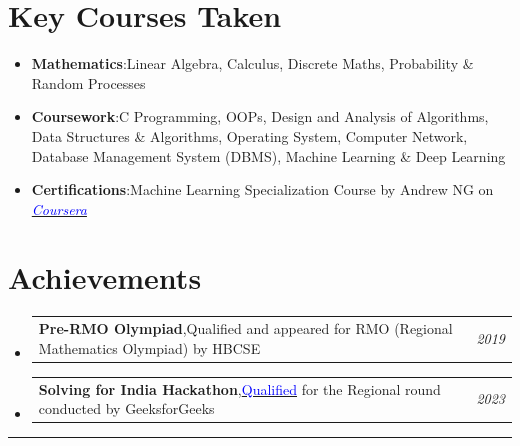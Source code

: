 \documentclass[a4paper,11pt]{article}
\makeatletter
\newcommand{\resumeItem}[2]{
  \item{
    \textbf{#1}{:\hspace{0.5mm}#2 \vspace{-0.5mm}}
  }
}
\newcommand{\resumePOR}[3]{
\vspace{0.5mm}\item
    \begin{tabular*}{0.97\textwidth}[t]{l@{\extracolsep{\fill}}r}
        \textbf{#1},\hspace{0.3mm}#2 & \textit{\small{#3}} 
    \end{tabular*}
    \vspace{-2mm}
}
\newcommand{\resumeSubItem}[2]{\resumeItem{#1}{#2}\vspace{-4pt}}
\newcommand{\resumeSubHeadingListStart}{\begin{itemize}[leftmargin=*,labelsep=0mm]}
\newcommand{\resumeHeadingSkillStart}{\begin{itemize}[leftmargin=*,itemsep=1.7mm, rightmargin=2ex]}
\newcommand{\resumeSubHeadingListEnd}{\end{itemize}\vspace{2mm}}
\newcommand{\resumeHeadingSkillEnd}{\end{itemize}\vspace{-2mm}}
\makeatother
\begin{document}
\section{Key Courses Taken}
\resumeHeadingSkillStart
 \resumeSubItem{Mathematics} %
    {Linear Algebra, Calculus, Discrete Maths, Probability \& Random Processes}
 \resumeSubItem{Coursework} %
    {C Programming, OOPs, Design and Analysis of Algorithms, Data Structures \& Algorithms, Operating System, Computer Network, Database Management System (DBMS), Machine Learning \& Deep Learning}
 \resumeSubItem{Certifications} %
    {Machine Learning Specialization Course by Andrew NG on \textit{\href{https://www.coursera.org/account/accomplishments/specialization/certificate/E3SC4AVDZXPE}{\textcolor{blue}{Coursera}}}}
\resumeHeadingSkillEnd





\section{Achievements}
\vspace{-0.2mm}
\resumeSubHeadingListStart
\resumePOR{Pre-RMO Olympiad} %
    {Qualified and appeared for RMO (Regional Mathematics Olympiad) by HBCSE} %
    {2019} %
\resumePOR{Solving for India Hackathon} %
    {\href{https://drive.google.com/file/d/1l458RtE9WB3WVtVLVn0uMJJE1zTLWra0/view?usp=sharing}{\textcolor{blue}{Qualified}} for the Regional round conducted by GeeksforGeeks} %
    {2023} %
\resumeSubHeadingListEnd

\vspace{-2mm}
\hspace*{-5mm}\rule{1.035\textwidth}{0.1mm}


\end{document}
